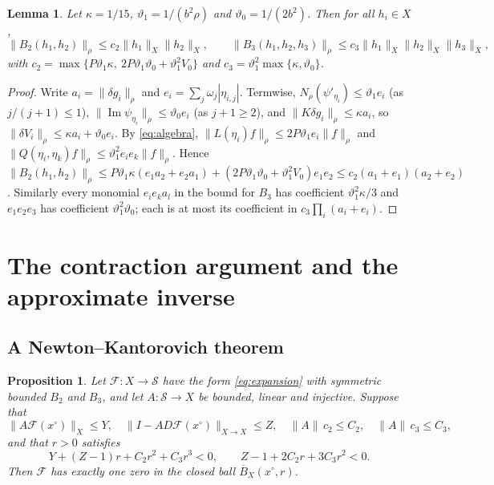 \documentclass[11pt]{amsart}
\newtheorem{proposition}[theorem]{Proposition}
\newtheorem{lemma}[theorem]{Lemma}
\theoremstyle{definition}
\theoremstyle{remark}
\numberwithin{equation}{section}
\newcommand{\Sc}{\mathcal{S}}
\newcommand{\Fc}{\mathcal{F}}
\DeclareMathOperator{\im}{Im}
\newcommand{\nrm}[1]{\lVert #1\rVert}
\begin{document}
\begin{lemma}\label{lem:nonlinear}
Let $\kappa=1/15$, $\vartheta_1=1/(b^2\rho)$ and $\vartheta_0=1/(2b^2)$. Then for all $h_i\in X$,
\[
\nrm{B_2(h_1,h_2)}_\rho\leq c_2\nrm{h_1}_X\nrm{h_2}_X,\qquad\nrm{B_3(h_1,h_2,h_3)}_\rho\leq c_3\nrm{h_1}_X\nrm{h_2}_X\nrm{h_3}_X,
\]
with $c_2=\max\{P\vartheta_1\kappa,\ 2P\vartheta_1\vartheta_0+\vartheta_1^2V_0\}$ and $c_3=\vartheta_1^2\max\{\kappa,\vartheta_0\}$.
\end{lemma}

\begin{proof}
Write $a_i=\nrm{\delta g_i}_\rho$ and $e_i=\sum_j\omega_j|\eta_{i,j}|$. Termwise, $N_\rho(\psi'_{\eta_i})\leq\vartheta_1e_i$ (as $j/(j+1)\leq1$), $\nrm{\im\psi_{\eta_i}}_\rho\leq\vartheta_0e_i$ (as $j+1\geq2$), and $\nrm{K\delta g_i}_\rho\leq\kappa a_i$, so $\nrm{\delta V_i}_\rho\leq\kappa a_i+\vartheta_0e_i$. By \eqref{eq:algebra}, $\nrm{L(\eta_i)f}_\rho\leq2P\vartheta_1e_i\nrm f_\rho$ and $\nrm{Q(\eta_i,\eta_k)f}_\rho\leq\vartheta_1^2e_ie_k\nrm f_\rho$. Hence $\nrm{B_2(h_1,h_2)}_\rho\leq P\vartheta_1\kappa(e_1a_2+e_2a_1)+(2P\vartheta_1\vartheta_0+\vartheta_1^2V_0)e_1e_2\leq c_2(a_1+e_1)(a_2+e_2)$. Similarly every monomial $e_ie_ka_l$ in the bound for $B_3$ has coefficient $\vartheta_1^2\kappa/3$ and $e_1e_2e_3$ has coefficient $\vartheta_1^2\vartheta_0$; each is at most its coefficient in $c_3\prod_i(a_i+e_i)$.
\end{proof}

\section{The contraction argument and the approximate inverse}\label{sec:inverse}

\subsection{A Newton--Kantorovich theorem}

\begin{proposition}\label{prop:NK}
Let $\Fc\colon X\to\Sc$ have the form \eqref{eq:expansion} with symmetric bounded $B_2$ and $B_3$, and let $A\colon\Sc\to X$ be bounded, linear and injective. Suppose that
\[
\nrm{A\Fc(x^\circ)}_X\leq Y,\quad\nrm{I-AD\Fc(x^\circ)}_{X\to X}\leq Z,\quad\nrm A\,c_2\leq C_2,\quad\nrm A\,c_3\leq C_3,
\]
and that $r>0$ satisfies
\begin{equation}\label{eq:radii}
Y+(Z-1)r+C_2r^2+C_3r^3<0,\qquad Z-1+2C_2r+3C_3r^2<0 .
\end{equation}
Then $\Fc$ has exactly one zero in the closed ball $\overline B_X(x^\circ,r)$.
\end{proposition}
\end{document}
